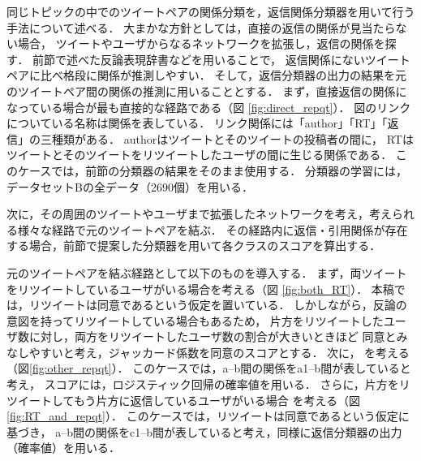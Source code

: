 \documentclass[japanese]{jnlp_1.4}
\newcommand{\addspan}[1]{}
\begin{document}
同じトピックの中でのツイートペアの関係分類を，返信関係分類器を用いて行う手法について述べる．
大まかな方針としては，直接の返信の関係が見当たらない場合，
ツイートやユーザからなるネットワークを拡張し，返信の関係を探す．
前節で述べた反論表現辞書などを用いることで，
返信関係にないツイートペアに比べ格段に関係が推測しやすい．
そして，返信分類器の出力の結果を元のツイートペア間の関係の推測に用いることとする．
まず，直接返信の関係になっている場合が最も直接的な経路である（図 \ref{fig:direct_repqt}）．
図のリンクについている名称は関係を表している．
リンク関係には「author」「RT」「返信」の三種類がある．
authorはツイートとそのツイートの投稿者の間に，
RTはツイートとそのツイートをリツイートしたユーザの間に生じる関係である．
このケースでは，前節の分類器の結果をそのまま使用する．
分類器の学習には，データセットBの全データ（2690個）を用いる．

次に，その周囲のツイートやユーザまで拡張したネットワークを考え，考えられる様々な経路で元のツイートペアを結ぶ．
その経路内に返信・引用関係が存在する場合，前節で提案した分類器を用いて各クラスのスコアを算出する．
\addspan{
最後に各クラス毎にスコアの和を計算し，最もスコアの高いクラスに分類する．
}
元のツイートペアを結ぶ経路として以下のものを導入する．
まず，両ツイートをリツイートしているユーザがいる場合を考える（図
\ref{fig:both_RT}）．
本稿では，リツイートは同意であるという仮定を置いている．
しかしながら，反論の意図を持ってリツイートしている場合もあるため，
片方をリツイートしたユーザ数に対し，両方をリツイートしたユーザ数の割合が大きいときほど
同意とみなしやすいと考え，\addspan{aをリツイートしたユーザ集合とbをリツイートしたユーザ集合の間の}ジャッカード係数を同意のスコアとする．
次に，\addspan{片方のツイートの投稿者が，もう片方のツイートに対し他のツイートで返信している場合}
を考える（図\ref{fig:other_repqt}）．
このケースでは，a--b間の関係をa1--b間が表していると考え，
スコアには，ロジスティック回帰\addspan{により求められた各クラス毎}の確率値を用いる．
さらに，片方をリツイートしてもう片方に返信しているユーザがいる場合
を考える（図\ref{fig:RT_and_repqt}）．
このケースでは，リツイートは同意であるという仮定に基づき，
a--b間の関係をc1--b間が表していると考え，同様に返信分類器の出力（\addspan{ロジスティック回帰により求められた各クラス毎の}確率値）を用いる．
\end{document}
